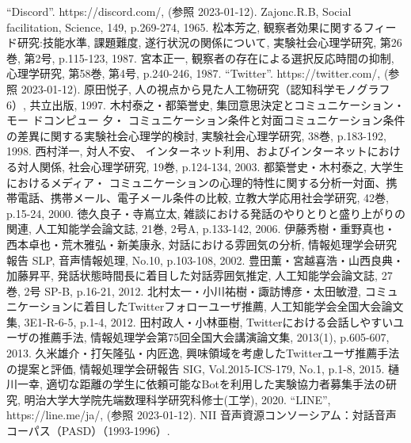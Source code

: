 
\begin{thebibliography}{99}
“Discord”. https://discord.com/, (参照 2023-01-12).
Zajonc.R.B, Social facilitation, Science, 149, p.269-274, 1965.
松本芳之, 観察者効果に関するフィード研究:技能水準, 課題難度, 遂行状況の関係について, 実験社会心理学研究, 第26巻, 第2号, p.115-123, 1987.
宮本正一, 観察者の存在による選択反応時間の抑制, 心理学研究, 第58巻, 第4号, p.240-246, 1987.
“Twitter”. https://twitter.com/, (参照 2023-01-12).
原田悦子, 人の視点から見た人工物研究（認知科学モノグラフ6）, 共立出版, 1997.
木村泰之・都築誉史, 集団意思決定とコミュニケーション・モー ドコンピュー 夕・ コミュニケーション条件と対面コミュニケーション条件の差異に関する実験社会心理学的検討, 実験社会心理学研究, 38巻, p.183-192, 1998.
西村洋一, 対人不安、 インターネット利用、およびインターネットにおける対人関係, 社会心理学研究, 19巻, p.124-134, 2003.
都築誉史・木村泰之, 大学生におけるメディア・ コミュニケーションの心理的特性に関する分析一対面、携帯電話、携帯メール、電子メール条件の比較, 立教大学応用社会学研究, 42巻, p.15-24, 2000.
徳久良子・寺嶌立太, 雑談における発話のやりとりと盛り上がりの関連, 人工知能学会論文誌, 21巻, 2号A, p.133-142, 2006.
伊藤秀樹・重野真也・西本卓也・荒木雅弘・新美康永, 対話における雰囲気の分析, 情報処理学会研究報告 SLP, 音声情報処理, No.10, p.103-108, 2002.
豊田薫・宮越喜浩・山西良典・加藤昇平, 発話状態時間長に着目した対話雰囲気推定, 人工知能学会論文誌, 27巻, 2号 SP-B, p.16-21, 2012.
北村太一・小川祐樹・諏訪博彦・太田敏澄, コミュニケーションに着目したTwitterフォローユーザ推薦, 人工知能学会全国大会論文集, 3E1-R-6-5, p.1-4, 2012.
田村政人・小林亜樹, Twitterにおける会話しやすいユーザの推薦手法, 情報処理学会第75回全国大会講演論文集, 2013(1), p.605-607, 2013.
久米雄介・打矢隆弘・内匠逸, 興味領域を考慮したTwitterユーザ推薦手法の提案と評価, 情報処理学会研報告 SIG, Vol.2015-ICS-179, No.1, p.1-8, 2015.
樋川一幸, 適切な距離の学生に依頼可能なBotを利用した実験協力者募集手法の研究, 明治大学大学院先端数理科学研究科修士(工学), 2020. 
“LINE”, https://line.me/ja/, (参照 2023-01-12).
NII 音声資源コンソーシアム：対話音声コーパス（PASD）（1993-1996）.
\end{thebibliography}
